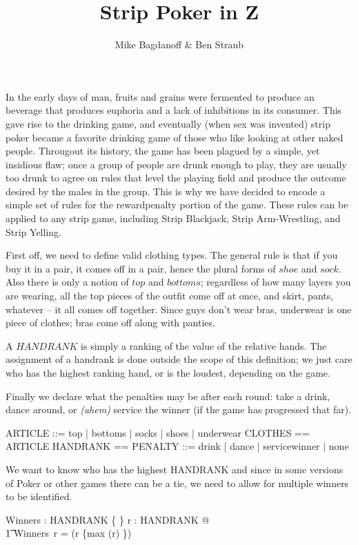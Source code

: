 \documentclass[11pt]{article}
\begin{document}
\title{Strip Poker in Z}
\author{Mike Bagdanoff \& Ben Straub}
\maketitle

In the early days of man, fruits and grains were fermented to produce an beverage that produces
euphoria and a lack of inhibitions in its consumer.  This gave rise to the drinking game, and
eventually (when sex was invented) strip poker became a favorite drinking game of those who like
looking at other naked people.  Througout its history, the game has been plagued by a simple, yet
insidious flaw; once a group of people are drunk enough to play, they are usually too drunk to agree
on rules that level the playing field and produce the outcome desired by the males in the group.
This is why we have decided to encode a simple set of rules for the reward\/penalty portion of the
game.  These rules can be applied to any strip game, including Strip Blackjack, Strip Arm-Wrestling,
and Strip Yelling.

First off, we need to define valid clothing types.  The general rule is that if you buy it in a
pair, it comes off in a pair, hence the plural forms of $shoe$ and $sock$.  Also there is only a
notion of $top$ and $bottoms$; regardless of how many layers you are wearing, all the top pieces of
the outfit come off at once, and skirt, pants, whatever -- it all comes off together.  Since guys
don't wear bras, underwear is one piece of clothes; bras come off along with panties.

A $HANDRANK$ is simply a ranking of the value of the relative hands.  The assignment of a handrank
is done outside the scope of this definition; we just care who has the highest ranking hand, or is
the loudest, depending on the game.

Finally we declare what the penalties may be after each round: take a drink, dance around, or
\textit{\tiny (ahem)} service the winner (if the game has progressed that far).

\begin{zed}
  ARTICLE ::= top | bottoms | socks | shoes | underwear \also
  CLOTHES == \power ARTICLE \also
  HANDRANK == \nat \also
  PENALTY ::= drink | dance | servicewinner | none
\end{zed}

We want to know who has the highest HANDRANK and since in some versions of Poker or other games
there can be a tie, we need to allow for multiple winners to be identified.
\begin{axdef}
  Winners : \seq HANDRANK \rel \{ \nat \}
  \where
  \forall r : \seq HANDRANK @ \\
  \t1 Winners~r = \dom (r \rres \{max (\ran r) \})
\end{axdef}
\end{document}
